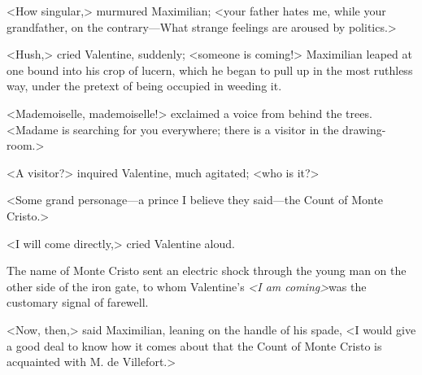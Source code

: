 <How singular,> murmured Maximilian; <your father hates me, while your grandfather, on the contrary—What strange feelings are aroused by politics.> 

 <Hush,> cried Valentine, suddenly; <someone is coming!> Maximilian leaped at one bound into his crop of lucern, which he began to pull up in the most ruthless way, under the pretext of being occupied in weeding it. 

 <Mademoiselle, mademoiselle!> exclaimed a voice from behind the trees. <Madame is searching for you everywhere; there is a visitor in the drawing-room.> 

 <A visitor?> inquired Valentine, much agitated; <who is it?> 

 <Some grand personage—a prince I believe they said—the Count of Monte Cristo.> 

 <I will come directly,> cried Valentine aloud. 

 The name of Monte Cristo sent an electric shock through the young man on the other side of the iron gate, to whom Valentine's \textit{<I am coming>}was the customary signal of farewell. 

 <Now, then,> said Maximilian, leaning on the handle of his spade, <I would give a good deal to know how it comes about that the Count of Monte Cristo is acquainted with M. de Villefort.> 